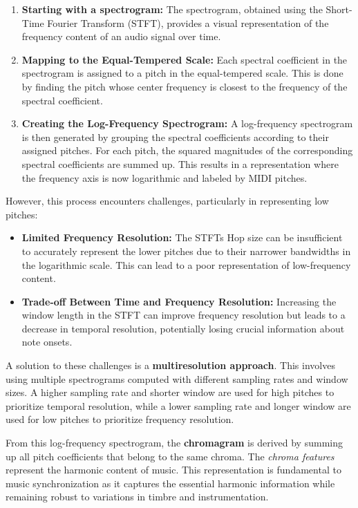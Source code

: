 \documentclass[a4paper, 9pt, twocolumn]{extarticle}
\begin{document}
\begin{enumerate}
  \def\labelenumi{\arabic{enumi}.}
  \item
        \textbf{Starting with a spectrogram:} The spectrogram, obtained using
        the Short-Time Fourier Transform (STFT), provides a visual
        representation of the frequency content of an audio signal over time.
  \item
        \textbf{Mapping to the Equal-Tempered Scale:} Each spectral
        coefficient in the spectrogram is assigned to a pitch in the
        equal-tempered scale. This is done by finding the pitch whose center
        frequency is closest to the frequency of the spectral coefficient.
  \item
        \textbf{Creating the Log-Frequency Spectrogram:} A log-frequency
        spectrogram is then generated by grouping the spectral coefficients
        according to their assigned pitches. For each pitch, the squared
        magnitudes of the corresponding spectral coefficients are summed up.
        This results in a representation where the frequency axis is now
        logarithmic and labeled by MIDI pitches.
\end{enumerate}
However, this process encounters challenges, particularly in
representing low pitches:
\begin{itemize}
  \item
        \textbf{Limited Frequency Resolution:} The STFT\textquotesingle s
        Hop size can be insufficient to accurately represent
        the lower pitches due to their narrower bandwidths in the logarithmic
        scale. This can lead to a poor representation of low-frequency
        content.
  \item
        \textbf{Trade-off Between Time and Frequency Resolution:} Increasing
        the window length in the STFT can improve frequency resolution but
        leads to a decrease in temporal resolution, potentially losing crucial
        information about note onsets.
\end{itemize}
A solution to these challenges is a \textbf{multiresolution approach}.
This involves using multiple spectrograms computed with different
sampling rates and window sizes. A higher sampling rate and shorter
window are used for high pitches to prioritize temporal resolution,
while a lower sampling rate and longer window are used for low pitches
to prioritize frequency resolution.

From this log-frequency spectrogram, the \textbf{chromagram} is derived
by summing up all pitch coefficients that belong to the same chroma. The
\emph{chroma features} represent the harmonic content of music. This
representation is fundamental to music synchronization as it captures
the essential harmonic information while remaining robust to variations
in timbre and instrumentation.
\end{document}
